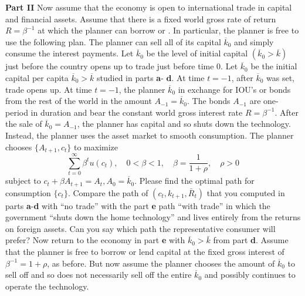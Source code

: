 \medskip\noindent
{\bf Part  II}
\medskip
{} Now assume that the economy is open to international trade in capital and financial assets. Assume that there is a fixed world gross rate of return $R=\beta^{-1}$ at which the planner can borrow or .
In particular, the planner is free to use the following plan. The planner can sell all of its capital $\overline{k}_0$ and simply consume the interest payments.
\noindent
Let $\overline{k}_0$ be the level of initial capital $(\overline{k}_0>\overline{k})$ just before the country opens up to trade just before time 0.  Let $\overline{k}_0$ be the initial capital per capita $\overline{k}_0 >\overline{k}$ studied in parts {\bf a}- {\bf d}.
At time $t=-1$, after $\overline{k}_0$ was set, trade opens up. At time $t=-1$, the planner  $\overline{k}_0$ in exchange for IOU's or bonds from the rest of the world in the amount $A_{-1}=\overline{k}_0$.
\medskip \noindent
The bonds $A_{-1}$ are one-period in duration and bear the constant world gross interest rate $R=\beta^{-1}$.
After the sale of $\overline{k}_0=A_{-1}$, the planner has  capital and so shuts down the technology. Instead, the planner uses the asset market to smooth consumption. The planner chooses $\{A_{t+1},c_t\}$ to maximize
$$ \sum_{t=0}^\infty \beta^t u(c_t),  \quad   0< \beta<1,\quad   \beta = {\frac{1}{1+\rho}},  \quad \rho>0$$
subject to
$c_t+\beta A_{t+1}=A_t,  A_0 = \overline{k}_0 .$
Please find the optimal path for consumption $\{c_t\}$.
%
\medskip
{} Compare the path of $(c_t,k_{t+1},\bar R_t)$ that you computed in parts {\bf a}-{\bf d} with ``no trade'' with the part {\bf e} path ``with trade'' in which the government ``shuts down the home technology'' and lives entirely from the returns on foreign assets. Can you say which path the representative consumer will prefer?
\medskip
{} Now return to the economy in part {\bf e} with $\overline{k}_0>\bar k$ from part {\bf d}.  Assume that the planner is free to borrow or lend capital at the fixed gross interest of $\beta^{-1}=1+\rho$, as before. But now assume the planner chooses the  amount of $\overline{k}_0$ to sell off and so does not necessarily sell off the entire $\overline{k}_0$ and possibly continues to operate the technology.


